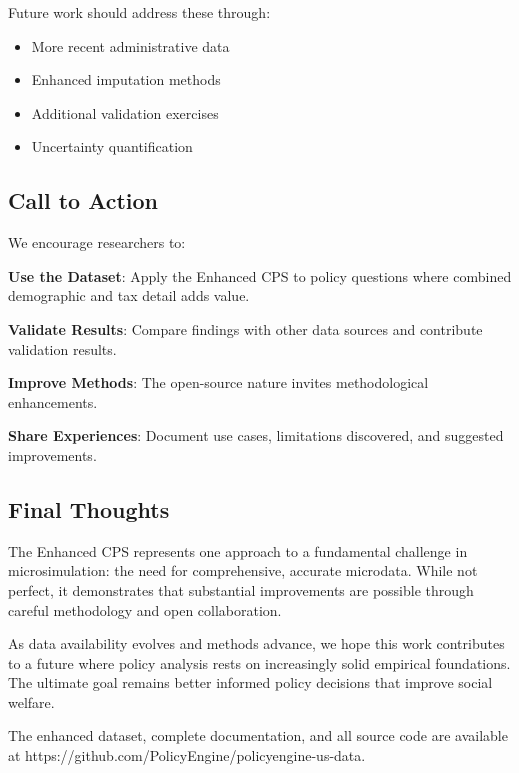 Future work should address these through:
\begin{itemize}
\item More recent administrative data
\item Enhanced imputation methods
\item Additional validation exercises
\item Uncertainty quantification
\end{itemize}

\subsection{Call to Action}

We encourage researchers to:

\textbf{Use the Dataset}: Apply the Enhanced CPS to policy questions where combined demographic and tax detail adds value.

\textbf{Validate Results}: Compare findings with other data sources and contribute validation results.

\textbf{Improve Methods}: The open-source nature invites methodological enhancements.

\textbf{Share Experiences}: Document use cases, limitations discovered, and suggested improvements.

\subsection{Final Thoughts}

The Enhanced CPS represents one approach to a fundamental challenge in microsimulation: the need for comprehensive, accurate microdata. While not perfect, it demonstrates that substantial improvements are possible through careful methodology and open collaboration.

As data availability evolves and methods advance, we hope this work contributes to a future where policy analysis rests on increasingly solid empirical foundations. The ultimate goal remains better informed policy decisions that improve social welfare.

The enhanced dataset, complete documentation, and all source code are available at https://github.com/PolicyEngine/policyengine-us-data.